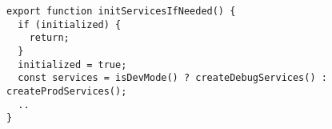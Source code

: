 \begin{verbatim}
export function initServicesIfNeeded() {
  if (initialized) {
    return;
  }
  initialized = true;
  const services = isDevMode() ? createDebugServices() : createProdServices();
  ..
}
\end{verbatim}
